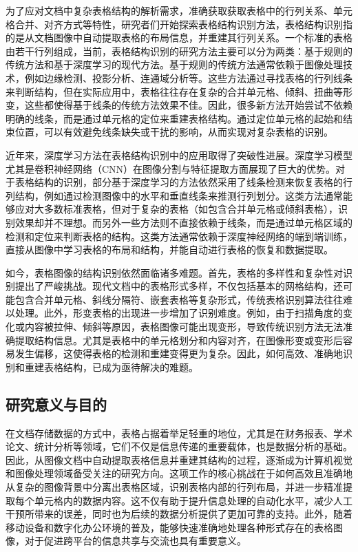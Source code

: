 \documentclass[UTF8,12pt, AutoFakeBold,fontset = founder]{ctexart}
\begin{document}
为了应对文档中复杂表格结构的解析需求，准确获取获取表格中的行列关系、单元格合并、对齐方式等特性，研究者们开始探索表格结构识别方法，表格结构识别指的是从文档图像中自动提取表格的布局信息，并重建其行列关系。一个标准的表格由若干行列组成，当前，表格结构识别的研究方法主要可以分为两类：基于规则的传统方法和基于深度学习的现代方法。基于规则的传统方法通常依赖于图像处理技术，例如边缘检测、投影分析、连通域分析等\cite{b3}。这些方法通过寻找表格的行列线条来判断结构，但在实际应用中，表格往往存在复杂的合并单元格、倾斜、扭曲等形变，这些都使得基于线条的传统方法效果不佳。因此，很多新方法开始尝试不依赖明确的线条，而是通过单元格的定位来重建表格结构。通过定位单元格的起始和结束位置，可以有效避免线条缺失或干扰的影响，从而实现对复杂表格的识别。

近年来，深度学习方法在表格结构识别中的应用取得了突破性进展\cite{b3}。深度学习模型尤其是卷积神经网络（CNN）在图像分割与特征提取方面展现了巨大的优势。对于表格结构的识别，部分基于深度学习的方法依然采用了线条检测来恢复表格的行列结构，例如通过检测图像中的水平和垂直线条来推测行列划分。这类方法通常能够应对大多数标准表格，但对于复杂的表格（如包含合并单元格或倾斜表格），识别效果却并不理想。而另外一些方法则不直接依赖于线条，而是通过单元格区域的检测和定位来判断表格的结构\cite{bcell}。这类方法通常依赖于深度神经网络的端到端训练，直接从图像中学习表格的布局和结构，并能自动进行表格的恢复和数据提取。

如今，表格图像的结构识别依然面临诸多难题。首先，表格的多样性和复杂性对识别提出了严峻挑战。现代文档中的表格形式多样，不仅包括基本的网格结构，还可能包含合并单元格、斜线分隔符、嵌套表格等复杂形式，传统表格识别算法往往难以处理。此外，形变表格的出现进一步增加了识别难度。例如，由于扫描角度的变化或内容被拉伸、倾斜等原因，表格图像可能出现变形，导致传统识别方法无法准确提取结构信息。尤其是表格中的单元格划分和内容对齐，在图像形变或变形后容易发生偏移，这使得表格的检测和重建变得更为复杂。因此，如何高效、准确地识别和重建表格结构，已成为亟待解决的难题。

\subsection{研究意义与目的}

在文档存储数据的方式中，表格占据着举足轻重的地位，尤其是在财务报表、学术论文、统计分析等领域，它们不仅是信息传递的重要载体，也是数据分析的基础。因此，从图像文档中自动提取表格信息并重建其结构的过程，逐渐成为计算机视觉和图像处理领域备受关注的研究方向。这项工作的核心挑战在于如何高效且准确地从复杂的图像背景中分离出表格区域，识别表格内部的行列布局，并进一步精准提取每个单元格内的数据内容。这不仅有助于提升信息处理的自动化水平，减少人工干预所带来的误差，同时也为后续的数据分析提供了更加可靠的支持。此外，随着移动设备和数字化办公环境的普及，能够快速准确地处理各种形式存在的表格图像，对于促进跨平台的信息共享与交流也具有重要意义。
\end{document}
